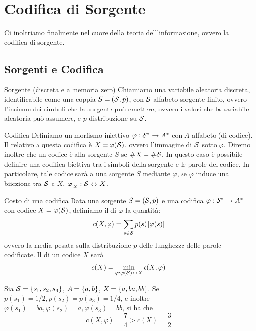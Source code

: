 \chapter{Codifica di Sorgente}

Ci inoltriamo finalmente nel cuore della teoria dell'informazione, ovvero la codifica di sorgente.

\section{Sorgenti e Codifica}

\begin{definition}{Sorgente (discreta e a memoria zero)}
  Chiamiamo  una variabile aleatoria discreta, identificabile come una coppia \(S = (\mathcal{S},p)\), con \(\mathcal{S}\) alfabeto sorgente finito, ovvero l'insieme dei simboli che la sorgente può emettere,
  ovvero i valori che la variabile aleatoria può assumere, e \(p\) distribuzione su \(\mathcal{S}\).
\end{definition}

\begin{definition}{Codifica}
  Definiamo  un morfismo iniettivo \(\varphi: \mathcal{S}^* \to A^*\) con \(A\) alfabeto (di codice).
  Il  relativo a questa codifica è \(X = \varphi(\mathcal{S})\), ovvero l'immagine di \(\mathcal{S}\) sotto \(\varphi\).
  Diremo inoltre che un codice è  alla sorgente \(S\) se \(\# X = \# \mathcal{S}\). In questo caso è possibile definire una codifica biettiva tra i simboli della sorgente e le parole del codice.
  In particolare, tale codice sarà  a una sorgente \(S\) mediante \(\varphi\), se \(\varphi\) induce una biiezione tra \(\mathcal{S}\) e \(X\), \(\varphi_{|_X}: \mathcal{S} \leftrightarrow X\).
\end{definition}


\begin{definition}{Costo di una codifica}
  Data una sorgente \(S = (\mathcal{S},p)\) e una codifica \(\varphi: \mathcal{S}^* \to A^*\) con codice \(X = \varphi(\mathcal{S})\), definiamo il  di \(\varphi\) la quantità:
  \[c(X,\varphi) = \sum_{s \in \mathcal{S}} p(s) \left|\varphi(s)\right|\]
  ovvero la media pesata sulla distribuzione \(p\) delle lunghezze delle parole codificate.
  Il  di un codice \(X\) sarà
  \[c(X) = \min_{\varphi: \varphi(\mathcal{S}) \leftrightarrow  X} c(X,\varphi)\]
\end{definition}


\begin{example}[label=ex:codifica]{}
  Sia \(\SCal = \set{s_1,s_2,s_3}\), \(A = \set{a,b}\), \(X = \set{a,ba,bb}\).
  Se \(p(s_1) = 1/2, p(s_2) = p(s_3) = 1/4\), e inoltre \(\varphi(s_1) = ba, \varphi(s_2) = a, \varphi(s_3) = bb\), si ha che
    \[c(X,\varphi) = \frac{7}{4} > c(X) = \frac{3}{2}\]
\end{example}

